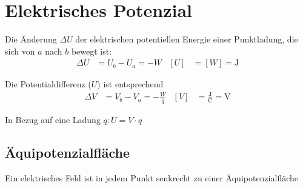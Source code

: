 \section{Elektrisches Potenzial}

Die Änderung $\Delta U$ der elektrischen potentiellen Energie einer Punktladung, die sich von $a$ nach $b$ bewegt ist:
\begin{align*}
 \Delta U &= U_b - U_a = -W & [U]& = [W] = \si{\joule}
\end{align*}

Die Potentialdifferenz ($U$) ist entsprechend
\begin{align*}
 \Delta V& = V_b - V_a = - \frac{W}{q}& [V]&= \frac{\si{\joule}}{\si{\coulomb}} = \si{\volt}
\end{align*}

In Bezug auf eine Ladung $q: U = V \cdot q$

\subsection{Äquipotenzialfläche} 
Ein elektrisches Feld ist in jedem Punkt senkrecht zu einer Äquipotenzialfläche


